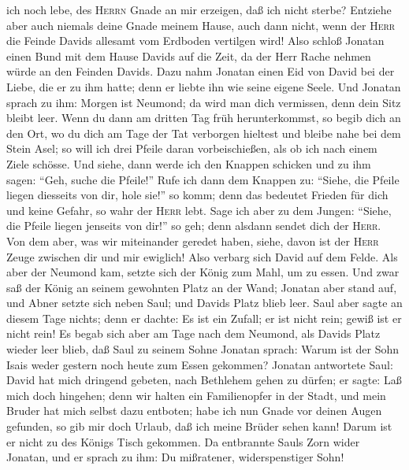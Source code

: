 ich noch lebe, des \textsc{Herrn} Gnade an mir erzeigen, daß ich nicht
sterbe?  Entziehe aber auch niemals deine Gnade meinem
Hause, auch dann nicht, wenn der \textsc{Herr} die Feinde Davids
allesamt vom Erdboden vertilgen wird!  Also schloß
Jonatan einen Bund mit dem Hause Davids auf die Zeit, da der Herr Rache
nehmen würde an den Feinden Davids.  Dazu nahm Jonatan
einen Eid von David bei der Liebe, die er zu ihm hatte; denn er liebte
ihn wie seine eigene Seele.  Und Jonatan sprach zu ihm:
Morgen ist Neumond; da wird man dich vermissen, denn dein Sitz bleibt
leer.  Wenn du dann am dritten Tag früh herunterkommst,
so begib dich an den Ort, wo du dich am Tage der Tat verborgen hieltest
und bleibe nahe bei dem Stein Asel;  so will ich drei
Pfeile daran vorbeischießen, als ob ich nach einem Ziele schösse.
 Und siehe, dann werde ich den Knappen schicken und zu
ihm sagen: ``Geh, suche die Pfeile!'' Rufe ich dann dem Knappen zu:
``Siehe, die Pfeile liegen diesseits von dir, hole sie!'' so komm; denn
das bedeutet Frieden für dich und keine Gefahr, so wahr der
\textsc{Herr} lebt.  Sage ich aber zu dem Jungen:
``Siehe, die Pfeile liegen jenseits von dir!'' so geh; denn alsdann
sendet dich der \textsc{Herr}.  Von dem aber, was wir
miteinander geredet haben, siehe, davon ist der \textsc{Herr} Zeuge
zwischen dir und mir ewiglich!  Also verbarg sich David
auf dem Felde. Als aber der Neumond kam, setzte sich der König zum Mahl,
um zu essen.  Und zwar saß der König an seinem gewohnten
Platz an der Wand; Jonatan aber stand auf, und Abner setzte sich neben
Saul; und Davids Platz blieb leer.  Saul aber sagte an
diesem Tage nichts; denn er dachte: Es ist ein Zufall; er ist nicht
rein; gewiß ist er nicht rein!  Es begab sich aber am
Tage nach dem Neumond, als Davids Platz wieder leer blieb, daß Saul zu
seinem Sohne Jonatan sprach: Warum ist der Sohn Isais weder gestern noch
heute zum Essen gekommen?  Jonatan antwortete Saul: David
hat mich dringend gebeten, nach Bethlehem gehen zu dürfen;
 er sagte: Laß mich doch hingehen; denn wir halten ein
Familienopfer in der Stadt, und mein Bruder hat mich selbst dazu
entboten; habe ich nun Gnade vor deinen Augen gefunden, so gib mir doch
Urlaub, daß ich meine Brüder sehen kann! Darum ist er nicht zu des
Königs Tisch gekommen.  Da entbrannte Sauls Zorn wider
Jonatan, und er sprach zu ihm: Du mißratener, widerspenstiger Sohn!
